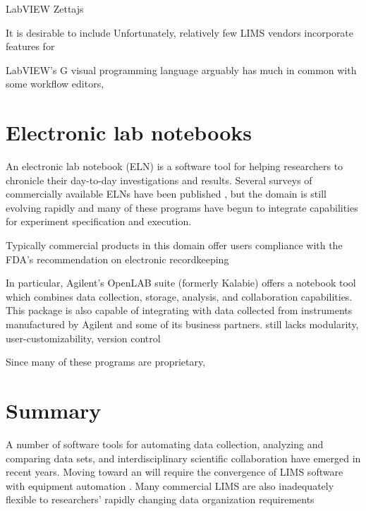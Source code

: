 LabVIEW
Zettajs

It is desirable to include
Unfortunately, relatively few LIMS vendors incorporate features for

LabVIEW's G visual programming language arguably has much in common
with some workflow editors,

\section{Electronic lab notebooks}

An electronic lab notebook (ELN) is a software tool for helping
researchers to chronicle their day-to-day investigations and
results. Several surveys of commercially available ELNs have been
published \cite{Rubacha2011, }, but the domain is still evolving
rapidly and many of these programs have begun to integrate
capabilities for experiment specification and execution.

Typically commercial products in this domain offer users compliance
with the FDA's recommendation on electronic recordkeeping \cite{FDA}

In particular, Agilent's OpenLAB suite (formerly Kalabie) offers a
notebook tool which combines data collection, storage, analysis, and
collaboration capabilities. This package is also capable of
integrating with data collected from instruments manufactured by
Agilent and some of its business partners.
 still lacks modularity,
user-customizability, version control

Since many of these programs are proprietary,


\section{Summary}

A number of software tools for automating data collection, analyzing
and comparing data sets, and interdisciplinary scientific
collaboration have emerged in recent years. Moving toward an    will
require the convergence of LIMS software with equipment automation .
Many commercial LIMS are also inadequately flexible to researchers'
rapidly changing data organization requirements
